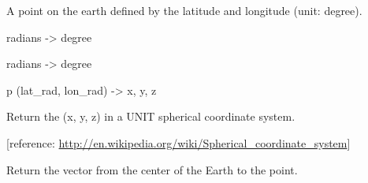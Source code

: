 \documentclass[letterpaper,10pt,english]{sphinxmanual}
\begin{document}
\begin{fulllineitems}
\label{code:pyesg.Point}
A point on the earth defined by the latitude and longitude (unit: degree).

\begin{fulllineitems}
\label{code:pyesg.Point.lat_deg}
radians -\textgreater{} degree

\end{fulllineitems}


\begin{fulllineitems}
\label{code:pyesg.Point.lon_deg}
radians -\textgreater{} degree

\end{fulllineitems}


\begin{fulllineitems}
\label{code:pyesg.Point.spherical_coord}
p (lat\_rad, lon\_rad) -\textgreater{} x, y, z

Return the (x, y, z) in a UNIT spherical coordinate system.

{[}reference: \href{http://en.wikipedia.org/wiki/Spherical\_coordinate\_system}{http://en.wikipedia.org/wiki/Spherical\_coordinate\_system}{]}

\end{fulllineitems}


\begin{fulllineitems}
\label{code:pyesg.Point.vector}
Return the vector from the center of the Earth to the point.

\end{fulllineitems}


\end{fulllineitems}

\end{document}
